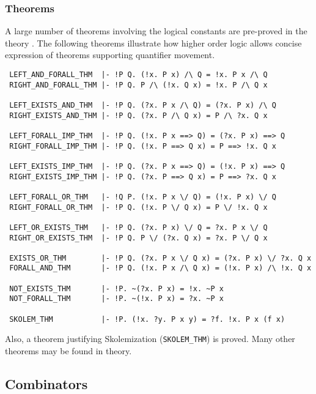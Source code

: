 \subsubsection{Theorems}

A large number of theorems involving the logical constants are
pre-proved in the theory . The following theorems
illustrate how higher order logic allows concise expression of
theorems supporting quantifier movement.

\begin{boxed}
\begin{verbatim}
 LEFT_AND_FORALL_THM  |- !P Q. (!x. P x) /\ Q = !x. P x /\ Q
 RIGHT_AND_FORALL_THM |- !P Q. P /\ (!x. Q x) = !x. P /\ Q x

 LEFT_EXISTS_AND_THM  |- !P Q. (?x. P x /\ Q) = (?x. P x) /\ Q
 RIGHT_EXISTS_AND_THM |- !P Q. (?x. P /\ Q x) = P /\ ?x. Q x

 LEFT_FORALL_IMP_THM  |- !P Q. (!x. P x ==> Q) = (?x. P x) ==> Q
 RIGHT_FORALL_IMP_THM |- !P Q. (!x. P ==> Q x) = P ==> !x. Q x

 LEFT_EXISTS_IMP_THM  |- !P Q. (?x. P x ==> Q) = (!x. P x) ==> Q
 RIGHT_EXISTS_IMP_THM |- !P Q. (?x. P ==> Q x) = P ==> ?x. Q x

 LEFT_FORALL_OR_THM   |- !Q P. (!x. P x \/ Q) = (!x. P x) \/ Q
 RIGHT_FORALL_OR_THM  |- !P Q. (!x. P \/ Q x) = P \/ !x. Q x

 LEFT_OR_EXISTS_THM   |- !P Q. (?x. P x) \/ Q = ?x. P x \/ Q
 RIGHT_OR_EXISTS_THM  |- !P Q. P \/ (?x. Q x) = ?x. P \/ Q x

 EXISTS_OR_THM        |- !P Q. (?x. P x \/ Q x) = (?x. P x) \/ ?x. Q x
 FORALL_AND_THM       |- !P Q. (!x. P x /\ Q x) = (!x. P x) /\ !x. Q x

 NOT_EXISTS_THM       |- !P. ~(?x. P x) = !x. ~P x
 NOT_FORALL_THM       |- !P. ~(!x. P x) = ?x. ~P x

 SKOLEM_THM           |- !P. (!x. ?y. P x y) = ?f. !x. P x (f x)
\end{verbatim}
\end{boxed}

Also, a theorem justifying Skolemization ({\small\verb+SKOLEM_THM+}) is
proved. Many other theorems may be found in  theory.

\subsection{Combinators}



